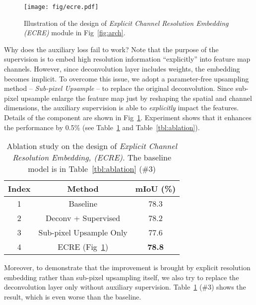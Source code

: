 \documentclass[runningheads]{llncs}
\begin{document}
\begin{figure}[h]
	\centering
	\texttt{[image: fig/ecre.pdf]}
	\caption{Illustration of the design of \emph{Explicit Channel Resolution Embedding (ECRE)} module in Fig~\ref{fig:arch}.}
	\label{fig:ecre}
\end{figure}

Why does the auxiliary loss fail to work? Note that the purpose of the supervision is to embed high resolution information ``explicitly'' into feature map channels. However, since deconvolution layer includes weights, the embedding becomes implicit. To overcome this issue, we adopt a parameter-free upsampling method -- \emph{Sub-pixel Upsample} \cite{Shi2016Real,Aitken2017Checkerboard} -- to replace the original deconvolution. Since sub-pixel upsample enlarge the feature map just by reshaping the spatial and channel dimensions, the auxiliary supervision is able to \emph{explicitly} impact the features. Details of the component are shown in Fig~\ref{fig:ecre}. Experiment shows that it enhances the performance by 0.5\% (see Table~\ref{tbl:ecre} and Table~\ref{tbl:ablation}). 


\begin{table}[h]

\begin{center}
\begin{tabular}{c|c|c}
\hline
Index & Method  & mIoU (\%) \\
\hline 1 & Baseline & 78.3 \\
\hline
2 & Deconv + Supervised & 78.2\\
\hline
3 & Sub-pixel Upsample Only  & 77.6\\
\hline
4 & ECRE (Fig~\ref{fig:ecre}) & \textbf{78.8}\\
\hline
\end{tabular}
\end{center}

\caption{Ablation study on the design of \emph{Explicit Channel Resolution Embedding, (ECRE)}. The baseline model is in Table~\ref{tbl:ablation} (\#3)}

\label{tbl:ecre}
\end{table}

Moreover, to demonstrate that the improvement is brought by explicit resolution embedding rather than sub-pixel upsampling itself, we also try to replace the deconvolution layer only without auxiliary supervision. Table~\ref{tbl:ecre} (\#3) shows the result, which is even worse than the baseline.
\end{document}
